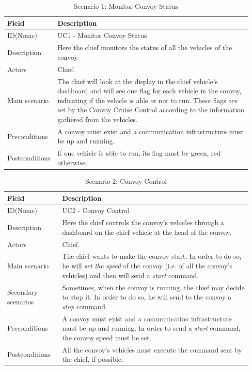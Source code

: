 \documentclass{llncs}
\begin{document}
\begin{table}[H]
\caption{Scenario 1: Monitor Convoy Status}
\label{tab:Scenario1}
\begin{tabular}{| p{2cm} | p{10cm} |}
\hline
\bf{Field} & \bf{Description}\\[3pt]
\hline
ID(Nome) & UC1 - Monitor Convoy Status\\[3pt]
\hline
Description & Here the chief monitors the status of all the vehicles of the convoy.\\[1pt]
\hline
Actors & Chief.\\[3pt]
\hline
Main scenario & The chief will look at the display in the chief vehicle's dashboard and will see one flag for each vehicle in the convoy, indicating if the vehicle is able or not to run. These flags are set by the Convoy Cruise Control according to the information gathered from the vehicles.\\[3pt]
\hline
Preconditions & A convoy must exist and a communication infrastructure must be up and running.\\[3pt]
\hline
Postconditions & If one vehicle is able to run, its flag must be green, red otherwise.\\[3pt]
\hline
\end{tabular}
\end{table}

\begin{table}[H]
\caption{Scenario 2: Convoy Control}
\label{tab:Scenario1}
\begin{tabular}{| p{2cm} | p{10cm} |}
\hline
\bf{Field} & \bf{Description}\\[3pt]
\hline
ID(Nome) & UC2 - Convoy Control\\[3pt]
\hline
Description & Here the chief controls the convoy's vehicles through a dashboard on the chief vehicle at the head of the convoy.\\[1pt]
\hline
Actors & Chief.\\[3pt]
\hline
Main scenario & The chief wants to make the convoy start. In order to do so, he will \emph{set the speed} of the convoy (i.e. of all the convoy's vehicles) and then will send a \emph{start} command.\\[3pt]
\hline
Secondary scenarios & Sometimes, when the convoy is running, the chief may decide to stop it. In order to do so, he will send to the convoy a \emph{stop} command.\\[3pt]
\hline
Preconditions & A convoy must exist and a communication infrastructure must be up and running. In order to send a \emph{start} command, the convoy speed must be set.\\[3pt]
\hline
Postconditions & All the convoy's vehicles must execute the command sent by the chief, if possible.\\[3pt]
\hline
\end{tabular}
\end{table}
\end{document}
